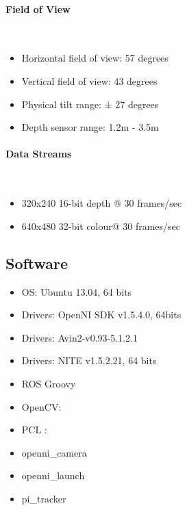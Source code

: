 	\paragraph{ Field of View} \mbox{} \\
		\begin{itemize}

			\item Horizontal field of view: 57 degrees
			\item Vertical field of view: 43 degrees
			\item Physical tilt range: ± 27 degrees
			\item Depth sensor range: 1.2m - 3.5m
		\end{itemize}

	\paragraph{ Data Streams} \mbox{} \\
		\begin{itemize}

			\item 320x240 16-bit depth @ 30 frames/sec
			\item 640x480 32-bit colour@ 30 frames/sec
		\end{itemize}


	\subsection{Software}
		\begin{itemize}
			\item{OS: Ubuntu 13.04, 64 bits}
			\item{Drivers: OpenNI SDK v1.5.4.0, 64bits}
			\item{Drivers: Avin2-v0.93-5.1.2.1}
			\item{Drivers: NITE v1.5.2.21, 64 bits}
			\item{ROS Groovy}
			\item{OpenCV: }
			\item{PCL : }
			\item{openni\_camera}
			\item{openni\_launch}
			\item{pi\_tracker}


		\end{itemize}